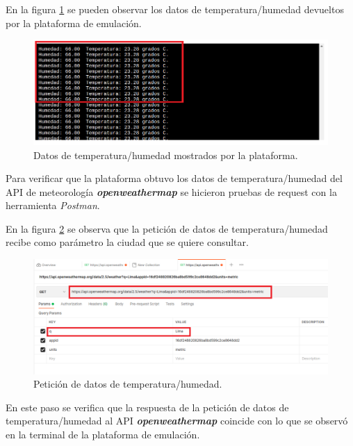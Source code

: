 En la figura \ref{fig:RespuestaEmulador1} se pueden observar los datos de temperatura/humedad devueltos por la plataforma de emulación.


\begin{figure}[ht]
	\centering
	\includegraphics[scale=.43]{./Figures/RespuestaEmulador1.png}
	\caption{Datos de temperatura/humedad mostrados por la plataforma.}
	\label{fig:RespuestaEmulador1}
\end{figure}


Para verificar que la plataforma obtuvo los datos de temperatura/humedad del API de meteorología  \textit{\textbf{openweathermap}} se hicieron pruebas de request con la herramienta \textit{Postman}.

En la figura \ref{fig:RespuestaPostMan1} se observa que la petición de datos de temperatura/humedad recibe como parámetro la ciudad que se quiere consultar.
\begin{figure}[ht]
	\centering
	\includegraphics[scale=.36]{./Figures/RespuestaPostMan1.png}
	\caption{Petición de datos de temperatura/humedad.}
	\label{fig:RespuestaPostMan1}
\end{figure}

En este paso se verifica que la respuesta de la petición de datos de temperatura/humedad al API \textit{\textbf{openweathermap}} coincide con lo que se observó en la terminal de la plataforma de emulación.

